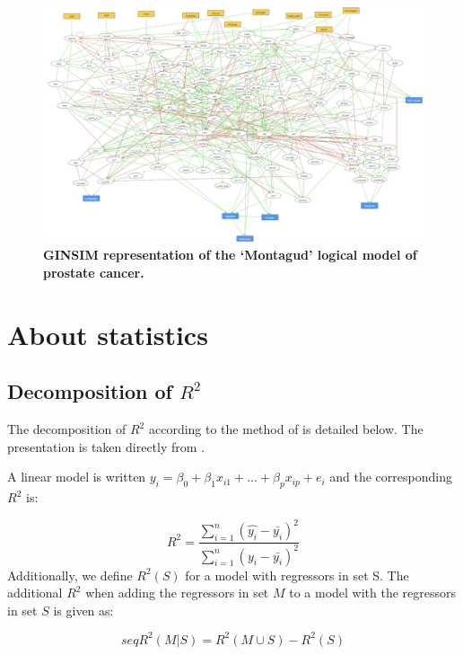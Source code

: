 \documentclass[a4paper,12pt,twoside,onecolumn,openright,final,oldfontcommands]{memoir}
\begin{document}
\begin{figure}

{\centering \includegraphics[width=0.9\linewidth]{fig/Montagud} 

}

\caption[Graphical abstract of PROFILE method to personalize logical models with omics data]{\textbf{GINSIM representation of the `Montagud'
logical model of prostate cancer.}}\label{fig:Montagud}
\end{figure}




\chapter{About statistics}\label{about-statistics}

\section{\texorpdfstring{Decomposition of
\(R^2\)}{Decomposition of R\^{}2}}\label{appendix-decomp}

The decomposition of \(R^2\) according to the method of
\citet{lindeman1980introduction} is detailed below. The presentation is
taken directly from \citet{gromping2006relative}.

A linear model is written
\(y_i=\beta_0+\beta_1x_{i1}+...+\beta_px_{ip}+e_i\) and the
corresponding \(R^2\) is:

\[R^2=\dfrac{\sum_{i=1}^{n} (\hat{y_i}-\bar{y_i})^2}{\sum_{i=1}^{n}  (y_i-\bar{y_i})^2}\]
Additionally, we define \(R^2(S)\) for a model with regressors in set S.
The additional \(R^2\) when adding the regressors in set \(M\) to a
model with the regressors in set \(S\) is given as:

\[seqR^2(M|S)=R^2(M\cup S)-R^2(S)\]
\end{document}
